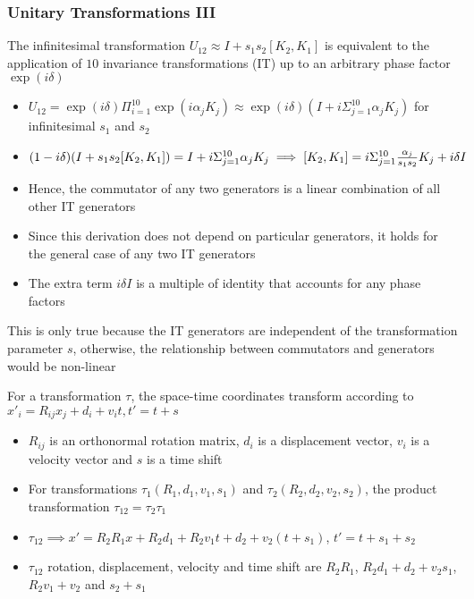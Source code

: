\documentclass[8pt,t,mathserif,aspectratio=169]{beamer}
\begin{document}
\begin{frame}
  \frametitle{Unitary Transformations III}
  \vspace{1mm}
  The infinitesimal transformation $U_{12} \approx I + s_1 s_2 [K_2,K_1]$ is equivalent to the application of $10$ invariance transformations (IT) up to an arbitrary phase factor $\exp(i \delta)$
  \begin{itemize}
    \item $U_{12} = \exp(i \delta) \Pi_{i = 1}^{10} \exp(i \alpha_j K_j) \approx \exp(i \delta) (I + i \Sigma_{j = 1}^{10} \alpha_j K_j)$ for infinitesimal $s_1$ and $s_2$
    \item $(1 - i \delta)(I + s_1 s_2 [K_2,K_1]) = I + i \Sigma_{j = 1}^{10} \alpha_j K_j \implies [K_2,K_1] =  i \Sigma_{j = 1}^{10} {\alpha_j \over s_1 s_2} K_j + i \delta I$
    \item Hence, the commutator of any two generators is a linear combination of all other IT generators
    \item Since this derivation does not depend on particular generators, it holds for the general case of any two IT generators
    \item The extra term $i \delta I$ is a multiple of identity that accounts for any phase factors
  \end{itemize}
  This is only true because the IT generators are independent of the transformation parameter $s$, otherwise, the relationship between commutators and generators would be non-linear

  For a transformation $\tau$, the space-time coordinates transform according to $x'_i = R_{ij} x_j + d_i + v_i t, t' = t + s$ 
  \begin{itemize}
    \item $R_{ij}$ is an orthonormal rotation matrix, $d_i$ is a displacement vector, $v_i$ is a velocity vector and $s$ is a time shift
    \item For transformations $\tau_1(R_1,d_1,v_1,s_1)$ and $\tau_2(R_2,d_2,v_2,s_2)$, the product transformation $\tau_{12} = \tau_2 \tau_1$
    \item $\tau_{12} \implies x' = R_2 R_1 x + R_2 d_1 + R_2 v_1 t + d_2 + v_2 (t + s_1)$, $t' = t + s_1 + s_2$
    \item $\tau_{12}$ rotation, displacement, velocity and time shift are $R_2 R_1$, $R_2 d_1 + d_2 + v_2 s_1$, $R_2 v_1 + v_2$ and $s_2 + s_1$
  \end{itemize}
\end{frame}
\end{document}
